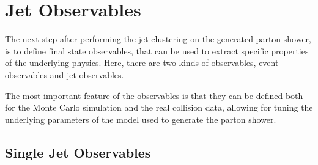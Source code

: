 \chapter{Jet Observables}

The next step after performing the jet clustering on the generated parton shower, is to define final state observables, that can be used to extract specific properties of the underlying physics. Here, there are two kinds of observables, event observables and jet observables.  

The most important feature of the observables is that they can be defined both for the Monte Carlo simulation and the real collision data, allowing for tuning the underlying parameters of the model used to generate the parton shower. 
\section{Single Jet Observables}




